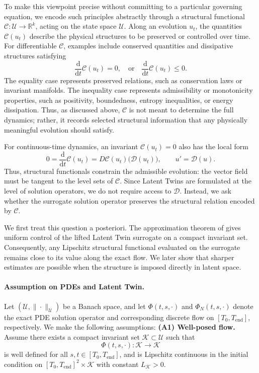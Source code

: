 \documentclass[a4paper,fleqn]{cas-sc}
\theoremstyle{thmstyleone}%
\theoremstyle{thmstyletwo}%
\theoremstyle{thmstylethree}%
\begin{document}
To make this viewpoint precise without committing to a particular governing equation, we encode such principles abstractly through a structural functional $\mathcal C : \mathcal U \to \mathbb R^k$, acting on the state space $\mathcal U$. Along an evolution $u_t$, the quantities $\mathcal C(u_t)$ describe the physical structures to be preserved or controlled over time. For differentiable $\mathcal C$, examples include conserved quantities and dissipative structures satisfying
\begin{equation}\label{eq:constraints}
    \frac{\mathrm d}{\mathrm dt}\mathcal C(u_t)=0,
    \quad \text{or} \quad
    \frac{\mathrm d}{\mathrm d t}\mathcal C(u_t)\le 0.
\end{equation}
The equality case represents preserved relations, such as conservation laws or invariant manifolds. The inequality case represents admissibility or monotonicity properties, such as positivity, boundedness, entropy inequalities, or energy dissipation. Thus, as discussed above, $\mathcal C$ is not meant to determine the full dynamics; rather, it records selected structural information that any physically meaningful evolution should satisfy.

For continuous-time dynamics, an invariant $\mathcal C(u_t)=0$ also has the local form
\begin{equation}\label{eq:constraint-chain-rule}
    0
    =
    \frac{\mathrm d}{\mathrm dt}\mathcal C(u_t)
    =
    D\mathcal C(u_t)\big(\mathcal D(u_t)\big),
    \qquad u'=\mathcal D(u).
\end{equation}
Thus, structural functionals constrain the admissible evolution: the vector
field must be tangent to the level sets of $\mathcal C$. Since Latent Twins are
formulated at the level of solution operators, we do not require access to
$\mathcal D$. Instead, we ask whether the surrogate solution operator preserves
the structural relation encoded by $\mathcal C$.

We first treat this question a posteriori. The approximation theorem of
\cite{chung2026latent} gives uniform control of the lifted Latent Twin surrogate
on a compact invariant set. Consequently, any Lipschitz structural functional
evaluated on the surrogate remains close to its value along the exact flow. We
later show that sharper estimates are possible when the structure is imposed
directly in latent space.

\paragraph{Assumption on PDEs and Latent Twin.}
Let $(\mathcal{U},\|\cdot\|_{\mathcal{U}})$ be a Banach space, and let $\Phi(t,s,\cdot)$ and $\Phi_N(t,s,\cdot)$ denote the exact PDE solution operator and corresponding discrete flow on $[T_0,T_{\mathrm{end}}]$, respectively. We make the following assumptions:
\smallskip\noindent
\textbf{(A1) Well-posed flow.}
Assume there exists a compact invariant set $\mathcal{K}\subset \mathcal{U}$ such that
$$
\Phi(t,s,\cdot):\mathcal{K}\to\mathcal{K}
$$
is well defined for all $s,t\in[T_0,T_{\mathrm{end}}]$, and is Lipschitz continuous in the initial condition on $[T_0,T_{\mathrm{end}}]^2\times\mathcal{K}$ with constant $L_{\mathcal{K}}>0$.
\end{document}
